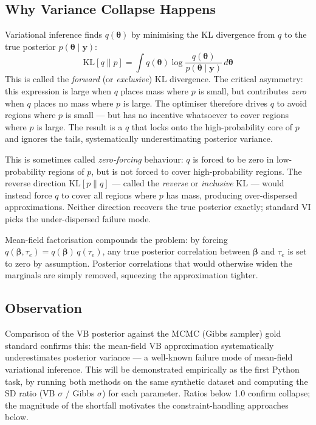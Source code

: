 \documentclass[11pt,a4paper]{article}
\begin{document}
\subsection*{Why Variance Collapse Happens}

Variational inference finds $q(\bm{\theta})$ by minimising the KL divergence from $q$ to the true posterior $p(\bm{\theta}\mid\bm{y})$:
\begin{equation}
  \mathrm{KL}[q \| p] = \int q(\bm{\theta}) \log \frac{q(\bm{\theta})}{p(\bm{\theta}\mid\bm{y})} \, d\bm{\theta}
\end{equation}
This is called the \emph{forward} (or \emph{exclusive}) KL divergence. The critical asymmetry: this expression is large when $q$ places mass where $p$ is small, but contributes \emph{zero} when $q$ places no mass where $p$ is large. The optimiser therefore drives $q$ to avoid regions where $p$ is small --- but has no incentive whatsoever to cover regions where $p$ is large. The result is a $q$ that locks onto the high-probability core of $p$ and ignores the tails, systematically underestimating posterior variance.

This is sometimes called \emph{zero-forcing} behaviour: $q$ is forced to be zero in low-probability regions of $p$, but is not forced to cover high-probability regions. The reverse direction $\mathrm{KL}[p \| q]$ --- called the \emph{reverse} or \emph{inclusive} KL --- would instead force $q$ to cover all regions where $p$ has mass, producing over-dispersed approximations. Neither direction recovers the true posterior exactly; standard VI picks the under-dispersed failure mode.

Mean-field factorisation compounds the problem: by forcing $q(\bm{\beta}, \tau_e) = q(\bm{\beta})\,q(\tau_e)$, any true posterior correlation between $\bm{\beta}$ and $\tau_e$ is set to zero by assumption. Posterior correlations that would otherwise widen the marginals are simply removed, squeezing the approximation tighter.

\subsection*{Observation}

Comparison of the VB posterior against the MCMC (Gibbs sampler) gold standard confirms this: the mean-field VB approximation systematically underestimates posterior variance --- a well-known failure mode of mean-field variational inference. This will be demonstrated empirically as the first Python task, by running both methods on the same synthetic dataset and computing the SD ratio (VB $\sigma$ / Gibbs $\sigma$) for each parameter. Ratios below 1.0 confirm collapse; the magnitude of the shortfall motivates the constraint-handling approaches below.
\end{document}

